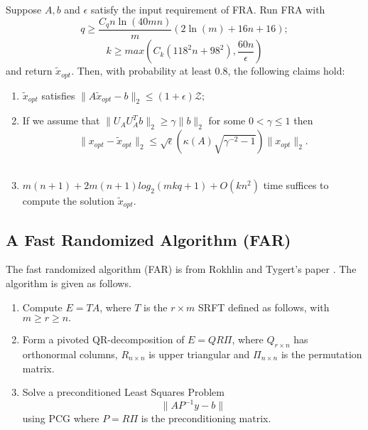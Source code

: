 
\begin{theorem}
	Suppose $A,b$ and $\epsilon$ satisfy the input requirement of FRA. Run FRA with
	\begin{equation}
	q \geq \frac{C_q n \ln(40mn)}{m} (2 \ln(m) + 16n + 16);
	\end{equation}
	\begin{equation}
	k \geq max \left( C_k (118^2 n + 98^2), \frac{60n}{\epsilon} \right)
	\end{equation}
	and return $\tilde{x}_{opt}.$ Then, with probability at least $0.8$, the following claims hold:
	\begin{enumerate}
		\item $\tilde{x}_{opt}$ satisfies $\| A \tilde{x}_{opt} - b \|_2  \leq (1 + \epsilon) \mathcal{Z}; $ \\
		\item If we assume that $\| U_A  U_A^T b \|_2 \geq \gamma \|b\|_2 $ for some $0< \gamma \leq 1$ then
		$$
		\| x_{opt} - \tilde{x}_{opt}\|_2 \leq \sqrt{\epsilon} \left( \kappa(A) \sqrt{\gamma^{-2} -1} \right) \| x_{opt}\|_2.
		$$\\
		\item $m(n+1) + 2m(n+1)log_2(mkq+1) + O(kn^2)$ time suffices to compute the solution $\tilde{x}_{opt}. $
	\end{enumerate}
\end{theorem}


\subsection{A Fast Randomized Algorithm (FAR)}
The fast randomized algorithm (FAR) is from Rokhlin and Tygert's paper \cite{SRFT2008}. The algorithm is given as follows.
	\begin{enumerate}
		\item Compute $E = TA$, where $T$ is the $r \times m$ SRFT defined as follows, with $m \geq r \geq n. $ \\
		\item Form a pivoted QR-decomposition of $E = Q R \Pi$,  where $Q_{r \times n}$ has orthonormal columns, $R_{n \times n}$ is upper triangular and $\Pi_{n \times n}$ is the permutation matrix.  \\
		\item Solve a preconditioned Least Squares Problem
		$$
		\| AP^{-1} y - b\|
		$$
		using PCG where $P = R \Pi$ is the preconditioning matrix.
	\end{enumerate}



